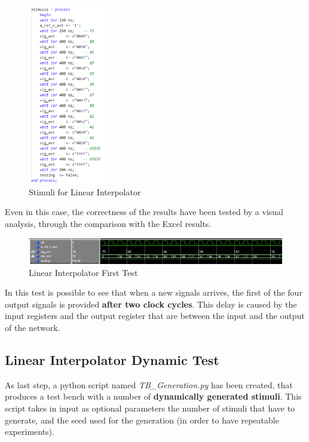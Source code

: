 \begin{figure}[H]
    \centering
    \includegraphics[width=0.3\textwidth]{img/Chapter4/Stimuli_Static.png}
    \caption{Stimuli for Linear Interpolator}
    \label{fig:LIStaticStimuli}
\end{figure}

Even in this case, the correctness of the results have been tested by a visual analysis, through the comparison with the Excel results.

\begin{figure}[H]
    \centering
    \includegraphics[width=1\textwidth]{img/Chapter4/LI_Static.png}
    \caption{Linear Interpolator First Test}
    \label{fig:LIStaticTest}
\end{figure}

In this test is possible to see that when a new signals arrives, the first of the four output signals is provided \textbf{after two clock cycles}. This delay is caused by the input registers and the output register that are between the input and the output of the network. 

\subsection{Linear Interpolator Dynamic Test}

As last step, a python script named \textit{TB\_Generation.py} has been created, that produces a test bench with a number of \textbf{dynamically generated stimuli}. This script takes in input as optional parameters the number of stimuli that have to generate, and the seed used for the generation (in order to have repeatable experiments).

